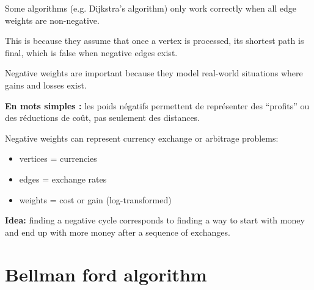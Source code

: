 \documentclass[11pt,a4paper,openany]{book}
\begin{document}
\begin{defnbox}[title=Why Negative Weights are a Problem]
Some algorithms (e.g. Dijkstra's algorithm) only work correctly when all edge weights are non-negative.

This is because they assume that once a vertex is processed, its shortest path is final, which is false when negative edges exist.
\end{defnbox}

\begin{defnbox}[title=Why Negative Weights are Useful]
Negative weights are important because they model real-world situations where gains and losses exist.

\textbf{En mots simples :} les poids négatifs permettent de représenter des “profits” ou des réductions de coût, pas seulement des distances.
\end{defnbox}

\begin{defnbox}[title=Example: Currency Exchange]
Negative weights can represent currency exchange or arbitrage problems:
\begin{itemize}
    \item vertices = currencies
    \item edges = exchange rates
    \item weights = cost or gain (log-transformed)
\end{itemize}

\textbf{Idea:} finding a negative cycle corresponds to finding a way to start with money and end up with more money after a sequence of exchanges.
\end{defnbox}











\vspace{2cm}





\section{Bellman ford algorithm}







\vspace{2cm}
\end{document}
